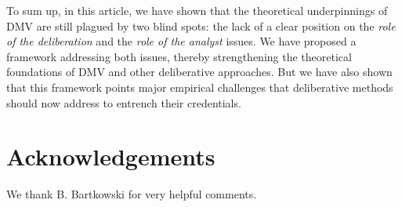 \documentclass[version=3.21, pagesize, twoside=off, bibliography=totoc, DIV=calc, fontsize=12pt, a4paper, french, english]{scrartcl}
\newenvironment{acknowledgements}{
	\section*{Acknowledgements}
}{
}
\begin{document}
To sum up, in this article, we have shown that the theoretical underpinnings of \ac{DMV} are still plagued by two blind spots: the lack of a clear position on the \emph{role of the deliberation} and the \emph{role of the analyst} issues. We have proposed a framework addressing both issues, thereby strengthening the theoretical foundations of \ac{DMV} and other deliberative approaches.  But we have also shown that this framework points major empirical challenges that deliberative methods should now address to entrench their credentials.


\begin{acknowledgements}
We thank B. Bartkowski for very helpful comments.
\end{acknowledgements}



\end{document}
